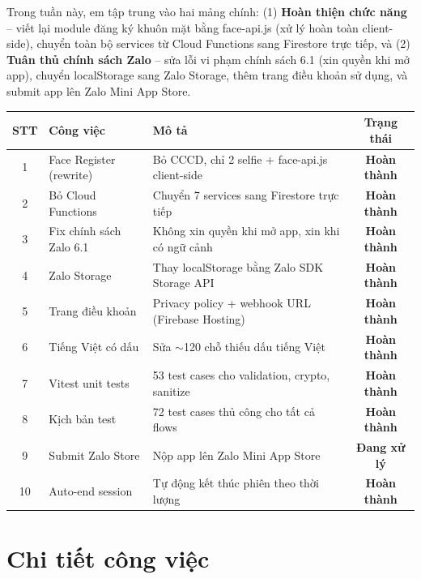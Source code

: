\documentclass{article}
\begin{document}
Trong tuần này, em tập trung vào hai mảng chính: (1) \textbf{Hoàn thiện chức năng} -- viết lại module đăng ký khuôn mặt bằng face-api.js (xử lý hoàn toàn client-side), chuyển toàn bộ services từ Cloud Functions sang Firestore trực tiếp, và (2) \textbf{Tuân thủ chính sách Zalo} -- sửa lỗi vi phạm chính sách 6.1 (xin quyền khi mở app), chuyển localStorage sang Zalo Storage, thêm trang điều khoản sử dụng, và submit app lên Zalo Mini App Store.

\begin{center}
\begin{tabularx}{\textwidth}{@{}c l X c@{}}
\toprule
\textbf{STT} & \textbf{Công việc} & \textbf{Mô tả} & \textbf{Trạng thái} \\
\midrule
1 & Face Register (rewrite) & Bỏ CCCD, chỉ 2 selfie + face-api.js client-side & \textcolor{statusgreen}{\textbf{Hoàn thành}} \\
2 & Bỏ Cloud Functions & Chuyển 7 services sang Firestore trực tiếp & \textcolor{statusgreen}{\textbf{Hoàn thành}} \\
3 & Fix chính sách Zalo 6.1 & Không xin quyền khi mở app, xin khi có ngữ cảnh & \textcolor{statusgreen}{\textbf{Hoàn thành}} \\
4 & Zalo Storage & Thay localStorage bằng Zalo SDK Storage API & \textcolor{statusgreen}{\textbf{Hoàn thành}} \\
5 & Trang điều khoản & Privacy policy + webhook URL (Firebase Hosting) & \textcolor{statusgreen}{\textbf{Hoàn thành}} \\
6 & Tiếng Việt có dấu & Sửa $\sim$120 chỗ thiếu dấu tiếng Việt & \textcolor{statusgreen}{\textbf{Hoàn thành}} \\
7 & Vitest unit tests & 53 test cases cho validation, crypto, sanitize & \textcolor{statusgreen}{\textbf{Hoàn thành}} \\
8 & Kịch bản test & 72 test cases thủ công cho tất cả flows & \textcolor{statusgreen}{\textbf{Hoàn thành}} \\
9 & Submit Zalo Store & Nộp app lên Zalo Mini App Store & \textcolor{statusamber}{\textbf{Đang xử lý}} \\
10 & Auto-end session & Tự động kết thúc phiên theo thời lượng & \textcolor{statusgreen}{\textbf{Hoàn thành}} \\
\bottomrule
\end{tabularx}
\end{center}

\section{Chi tiết công việc}
\end{document}
